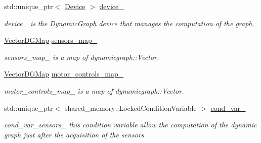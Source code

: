 \begin{DoxyCompactItemize}
\mbox{\label{classdynamic__graph_1_1DynamicGraphManager_a416ca1c33660df4f7f74eb29df4c5a58}} 
std\+::unique\+\_\+ptr$<$ \hyperlink{classdynamic__graph_1_1Device}{Device} $>$ \hyperlink{classdynamic__graph_1_1DynamicGraphManager_a416ca1c33660df4f7f74eb29df4c5a58}{device\+\_\+}
\begin{DoxyCompactList}\small\item\em device\+\_\+ is the Dynamic\+Graph device that manages the computation of the graph. \end{DoxyCompactList}\item 
\hyperlink{namespacedynamic__graph_abd184187f3bc15df5e227d866529e4a7}{Vector\+D\+G\+Map} \hyperlink{classdynamic__graph_1_1DynamicGraphManager_a896bf6cb22d2d88a5a6a307a2e44608e}{sensors\+\_\+map\+\_\+}
\begin{DoxyCompactList}\small\item\em sensors\+\_\+map\+\_\+ is a map of dynamicgraph\+::\+Vector. \end{DoxyCompactList}\item 
\hyperlink{namespacedynamic__graph_abd184187f3bc15df5e227d866529e4a7}{Vector\+D\+G\+Map} \hyperlink{classdynamic__graph_1_1DynamicGraphManager_a03eabd2f08990a1dcc1caa652b701020}{motor\+\_\+controls\+\_\+map\+\_\+}
\begin{DoxyCompactList}\small\item\em motor\+\_\+controls\+\_\+map\+\_\+ is a map of dynamicgraph\+::\+Vector. \end{DoxyCompactList}\item 
\mbox{\label{classdynamic__graph_1_1DynamicGraphManager_a003d8598839c07a7d81c1afed0ea0b01}} 
std\+::unique\+\_\+ptr$<$ shared\+\_\+memory\+::\+Locked\+Condition\+Variable $>$ \hyperlink{classdynamic__graph_1_1DynamicGraphManager_a003d8598839c07a7d81c1afed0ea0b01}{cond\+\_\+var\+\_\+}
\begin{DoxyCompactList}\small\item\em cond\+\_\+var\+\_\+sensors\+\_\+ this condition variable allow the computation of the dynamic graph just after the acquisition of the sensors \end{DoxyCompactList}\item 
\mbox{\label{classdynamic__graph_1_1DynamicGraphManager_a7e6cc5e58f1accce947f929d233a67fd}} 

\end{DoxyCompactItemize}
